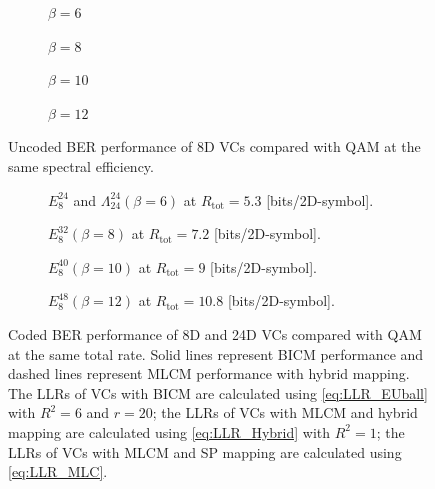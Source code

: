 \documentclass[journal]{IEEEtran}
\begin{document}
\begin{figure}[tbp]
    \centering
    \begin{subfigure}{.45\linewidth}
        
        \caption{$\beta=6$}
        \label{fig:uncodedBER8D}
    \end{subfigure}
    \begin{subfigure}{.45\linewidth}
        
        \caption{$\beta=8$}
        \label{fig:uncodedBER16D}
    \end{subfigure}
    \begin{subfigure}{.45\linewidth}
        
        \caption{$\beta=10$}
        \label{fig:uncodedBER16D}
    \end{subfigure}
        \begin{subfigure}{.45\linewidth}
        
        \caption{$\beta=12$}
        \label{fig:uncodedBER16D}
    \end{subfigure}
    \caption{Uncoded BER performance of 8D VCs compared with QAM at the same spectral efficiency.}
    \label{fig:uncodedBER}
\end{figure}
\vspace{-5pt}
\begin{figure}[tbp]
    \centering
    \begin{subfigure}{0.45\linewidth}
         \centering
         
        \caption{$E_8^{24}$ and $\Lambda_{24}^{24} (\beta=6)$ at $R_{\text{tot}}= 5.3$ [bits/2D-symbol].}
        \label{fig:codedSE6}
    \end{subfigure}
    \begin{subfigure}{0.45\linewidth}
        \centering
        
        \caption{$E_8^{32} (\beta=8)$ at $R_{\text{tot}}= 7.2$ [bits/2D-symbol].}
        \label{fig:codedSE8}
    \end{subfigure}
    \begin{subfigure}{0.45\linewidth}
        \centering
        
        \caption{$E_8^{40} (\beta=10)$ at $R_{\text{tot}}= 9$ [bits/2D-symbol].}
        \label{fig:codedSE10}
    \end{subfigure}
    \begin{subfigure}{0.45\linewidth}
        \centering
        
        \caption{$E_8^{48} (\beta=12)$ at $R_{\text{tot}}= 10.8$ [bits/2D-symbol].}
        \label{fig:codedSE12}
    \end{subfigure}
    \caption{Coded BER performance of 8D and 24D VCs compared with QAM at the same total rate. Solid lines represent BICM performance and dashed lines represent MLCM performance with hybrid mapping. The LLRs of VCs with BICM are calculated using \eqref{eq:LLR_EUball} with $R^2=6$ and $r=20$; the LLRs of VCs with MLCM and hybrid mapping are calculated using \eqref{eq:LLR_Hybrid} with $R^2=1$; the LLRs of VCs with MLCM and SP mapping are calculated using \eqref{eq:LLR_MLC}.}
    \label{fig:coded8D}
\end{figure}
\end{document}

